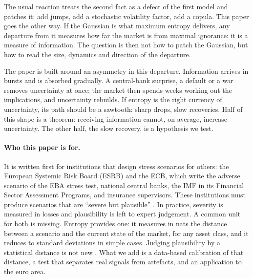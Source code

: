 \documentclass[11pt]{article}
\theoremstyle{definition}
\begin{document}
The usual reaction treats the second fact as a defect of the first model and
patches it: add jumps, add a stochastic volatility factor, add a copula. This
paper goes the other way. If the Gaussian is what maximum entropy delivers,
any departure from it measures how far the market is from maximal ignorance:
it is a measure of information. The question is then not how to patch the
Gaussian, but how to read the size, dynamics and direction of the departure.

The paper is built around an asymmetry in this departure. Information arrives
in bursts and is absorbed gradually. A central-bank surprise, a default or a
war removes uncertainty at once; the market then spends weeks working out the
implications, and uncertainty rebuilds. If entropy is the right currency of
uncertainty, its path should be a sawtooth: sharp drops, slow recoveries. Half
of this shape is a theorem: receiving information cannot, on average, increase
uncertainty. The other half, the slow recovery, is a hypothesis we test.

\paragraph{Who this paper is for.} It is written first for institutions that
design stress scenarios for others: the European Systemic Risk Board (ESRB)
and the ECB, which write the adverse scenario of the EBA stress test, national
central banks, the IMF in its Financial Sector Assessment Programs, and
insurance supervisors. These institutions must produce scenarios that are
``severe but plausible'' \citep{bcbs2018}. In practice, severity is measured in
losses and plausibility is left to expert judgement. A common unit for both is
missing. Entropy provides one: it measures in nats the distance between a
scenario and the current state of the market, for any asset class, and it
reduces to standard deviations in simple cases. Judging plausibility by a
statistical distance is not new \citep{breuer2009,breuer2013,glasserman2014}.
What we add is a data-based calibration of that distance, a test that
separates real signals from artefacts, and an application to the euro area.
\end{document}
